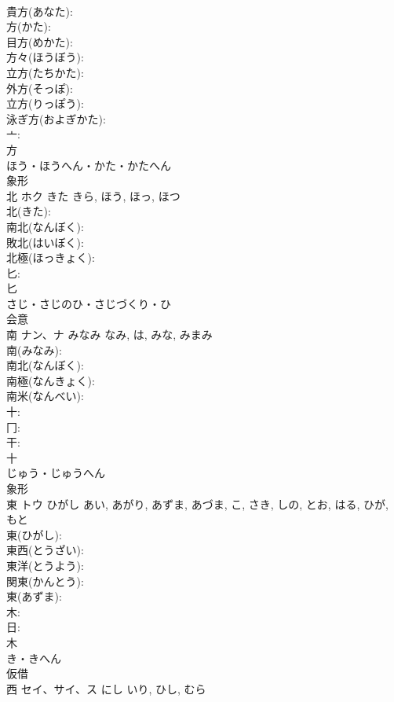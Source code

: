 \documentclass[8pt]{extreport}
\begin{document}
\begin{CJK}{UTF8}{min}
\\	貴方(あなた): 
\\	方(かた): 
\\	目方(めかた): 
\\	方々(ほうぼう): 
\\	立方(たちかた): 
\\	外方(そっぽ): 
\\	立方(りっぽう): 
\\	泳ぎ方(およぎかた): 
\\	亠: 
\\	方	
\\	ほう・ほうへん・かた・かたへん	
\\	象形 
\\	北	ホク	きた	きら, ほう, ほっ, ほつ	
\\	北(きた): 
\\	南北(なんぼく): 
\\	敗北(はいぼく): 
\\	北極(ほっきょく): 
\\	匕: 
\\	匕	
\\	さじ・さじのひ・さじづくり・ひ	
\\	会意 
\\	南	ナン、ナ	みなみ	なみ, は, みな, みまみ	
\\	南(みなみ): 
\\	南北(なんぼく): 
\\	南極(なんきょく): 
\\	南米(なんべい): 
\\	十: 
\\	冂: 
\\	干: 
\\	十	
\\	じゅう・じゅうへん	
\\	象形 
\\	東	トウ	ひがし	あい, あがり, あずま, あづま, こ, さき, しの, とお, はる, ひが, もと	
\\	東(ひがし): 
\\	東西(とうざい): 
\\	東洋(とうよう): 
\\	関東(かんとう): 
\\	東(あずま): 
\\	木: 
\\	日: 
\\	木	
\\	き・きへん	
\\	仮借 
\\	西	セイ、サイ、ス	にし	いり, ひし, むら	

\end{CJK}
\end{document}
